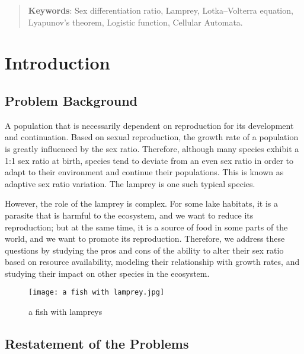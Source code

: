 \documentclass[12pt]{article}  %
\begin{document}
\begin{abstract}
    \vspace{5pt}
    \textbf{Keywords}: Sex differentiation ratio, Lamprey, Lotka–Volterra equation, Lyapunov's theorem, Logistic function, Cellular Automata.

\end{abstract}

\maketitle  %
\tableofcontents  %

\section{Introduction}
\subsection{Problem Background}
A population that is necessarily dependent on reproduction for its development and continuation. Based on sexual reproduction, the growth rate of a population is greatly influenced by the sex ratio. Therefore, although many species exhibit a 1:1 sex ratio at birth, species tend to deviate from an even sex ratio in order to adapt to their environment and continue their populations. This is known as adaptive sex ratio variation.\cite{1} The lamprey is one such typical species.

However, the role of the lamprey is complex. For some lake habitats, it is a parasite that is harmful to the ecosystem, and we want to reduce its reproduction; but at the same time, it is a source of food in some parts of the world, and we want to promote its reproduction.\cite{2} Therefore, we address these questions by studying the pros and cons of the ability to alter their sex ratio based on resource availability, modeling their relationship with growth rates, and studying their impact on other species in the ecosystem.
\begin{figure}[htbp]
	\centering
	\texttt{[image: a fish with lamprey.jpg]}
	\caption{a fish with lampreys}\label{a fish with lampreys}
\end{figure}
\subsection{Restatement of the Problems}
\end{document}
